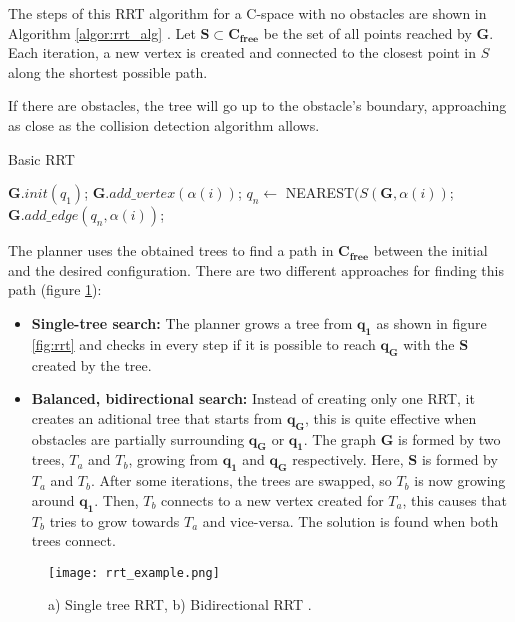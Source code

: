 The steps of this RRT algorithm for a C-space with no obstacles are shown in Algorithm \ref{algor:rrt_alg} \citep{planning}. Let $\bm{S}\subset \bm{C_{free}}$ be the set of all points reached by $\bm{G}$. Each iteration, a new vertex is created and connected to the closest point in $S$ along the shortest possible path. 

If there are obstacles, the tree will go up to the obstacle's boundary, approaching as close as the collision detection algorithm allows.

\begin{algorithm}[t!]
	\caption{Basic RRT}\label{algor:rrt_alg}
	\begin{algorithmic}[1]
		\State $\bm{G}.init(q_{1})$;
		\vspace{-2pt}
		\State $\bm{G}.add\_vertex(\alpha(i))$;
		\vspace{-2pt}
		\State $q_n \longleftarrow$ NEAREST$(S(\bm{G},\alpha(i))$;
		\vspace{-2pt}
		\State $\bm{G}.add\_edge(q_n,\alpha(i))$;
		\vspace{-2pt}
		\EndFor 
	\end{algorithmic}
\end{algorithm}

The planner uses the obtained trees to find a path in $\bm{C_{free}}$ between the initial and the desired configuration. There are two different approaches for finding this path (figure \ref{fig:rrt_ex}):
\begin{itemize}
	\item \textbf{Single-tree search:} The planner grows a tree from $\bm{q_1}$ as shown in figure \ref{fig:rrt} and checks in every step if it is possible to reach $\bm{q_G}$ with the $\bm{S}$ created by the tree.
	\item \textbf{Balanced, bidirectional search:} Instead of creating only one RRT, it creates an aditional tree that starts from $\bm{q_G}$, this is quite effective when obstacles are partially surrounding $\bm{q_G}$ or $\bm{q_1}$. The graph $\bm{G}$ is formed by two trees, $T_a$ and $T_b$, growing from $\bm{q_1}$ and $\bm{q_G}$ respectively. Here, $\bm{S}$ is formed by $T_a$ and $T_b$. After some iterations, the trees are swapped, so $T_b$ is now growing around $\bm{q_1}$. Then, $T_b$ connects to a new vertex created for $T_a$, this causes that $T_b$ tries to grow towards $T_a$ and vice-versa. The solution is found when both trees connect.
\end{itemize}

\begin{figure}[H]
	\centering
	\texttt{[image: rrt\_example.png]}
	\vspace{-10pt}
	\caption{ a) Single tree RRT, b) Bidirectional RRT \citep[chap.5, page 219]{planning}.}
	\vspace{-15pt}
	\label{fig:rrt_ex}
\end{figure}

